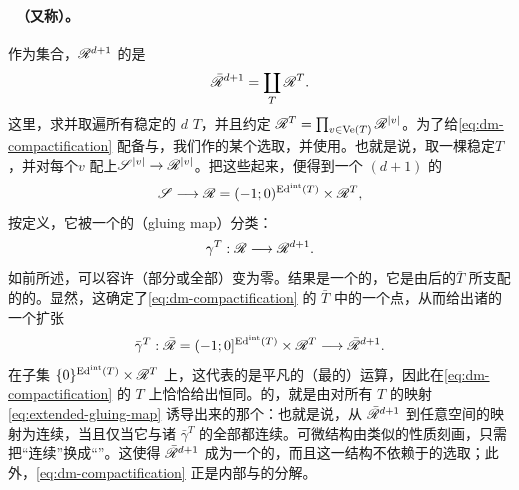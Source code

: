 \paragraph{~\trDeligneMumfordStasheff{}\trCompactification（又称\trAssociahedron）。}\label{sub:dm-stasheff}
作为集合，$\mathscr{R}^{d+1}$ 的\trDeligneMumfordStasheff{}\trCompactification{}是
\begin{equation}\label{eq:dm-compactification}
\bar{\mathscr{R}}^{d+1}=\coprod_T\mathscr{R}^T.
\end{equation}
这里，求并取遍所有稳定的 $d$ \trLeafedTree{}$T$，并且约定
$\mathscr{R}^T=\prod_{v\in\mathrm{Ve}(T)}\mathscr{R}^{|v|}$。为了给\eqref{eq:dm-compactification} 配备\trTopology{}与\trSmoothStructure，我们作\trStriplikeEnd{}的某个\trUniversal{}选取，并使用\trGluingConstruction。也就是说，取一棵稳定\trTree{}$T$，并对每个\trVertex{}$v$ 配上\trUniversal\trFamily{}$\mathscr{S}^{|v|}\to\mathscr{R}^{|v|}$。把这些\trGluing{}起来，便得到一个 $(d+1)$ \trPointedDisc{}的\trFamily
\begin{equation}\label{eq:gluing-family}
\mathscr{S}\longrightarrow\mathscr{R}=(-1;0)^{\mathrm{Ed}^{\mathrm{int}}(T)}\times\mathscr{R}^T,
\end{equation}
按定义，它被一个\trSmooth{}的\textbf{\trGluingMap}（gluing map）分类：
\begin{equation}\label{eq:gluing-map}
\gamma^T:\mathscr{R}\longrightarrow\mathscr{R}^{d+1}.
\end{equation}
如前所述，可以容许（部分或全部）\trGluingParameter{}变为零。结果是一个\trDegenerate{}的\trGluing\trSurface，它是由\trCollapse{}后的\trTree{}$\bar{T}$ 所支配的\trPointedDisc{}的\trDisjointUnion。显然，这确定了\eqref{eq:dm-compactification} 的 $\bar{T}$ \trStratum{}中的一个点，从而给出诸\trGluingMap{}的一个\trCanonical{}扩张
\begin{equation}\label{eq:extended-gluing-map}
\bar\gamma^T:\bar{\mathscr{R}}=(-1;0]^{\mathrm{Ed}^{\mathrm{int}}(T)}\times\mathscr{R}^T\longrightarrow\bar{\mathscr{R}}^{d+1}.
\end{equation}
在子集 $\{0\}^{\mathrm{Ed}^{\mathrm{int}}(T)}\times\mathscr{R}^T$ 上，这代表的是平凡的（最\trDegenerate{}的）\trGluing{}运算，因此在\eqref{eq:dm-compactification} 的 $T$ \trStratum{}上恰恰给出恒同。\trDeligneMumfordStasheff{}\trCompactification{}的\trTopology{}，就是由对所有 $T$ 的映射\eqref{eq:extended-gluing-map} 诱导出来的那个：也就是说，从 $\bar{\mathscr{R}}^{d+1}$ 到任意空间的映射为连续，当且仅当它与诸 $\bar\gamma^T$ 的全部\trComposition{}都连续。可微结构由类似的性质刻画，只需把“连续”换成“\trSmooth”。这使得 $\bar{\mathscr{R}}^{d+1}$ 成为一个\trCompact{}的\trCorneredBoundary\trManifold，而且这一结构不依赖于\trStriplikeEnd{}的\trUniversal{}选取；此外，\eqref{eq:dm-compactification} 正是内部与\trConnected\trBoundaryStratum{}的分解。
